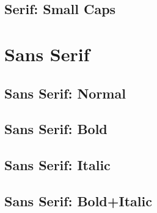 \subsection{Serif: Small Caps}
\begin{rmfamily}
    \begin{scshape}
        \blindtext
    \end{scshape}
\end{rmfamily}



\section{Sans Serif}
\subsection{Sans Serif: Normal}
\begin{sffamily}
    \blindtext
\end{sffamily}

\subsection{Sans Serif: Bold}
\begin{sffamily}
    \begin{bfseries}
        \blindtext
    \end{bfseries}
\end{sffamily}

\subsection{Sans Serif: Italic}
\begin{sffamily}
    \begin{itshape}
        \blindtext
    \end{itshape}
\end{sffamily}

\subsection{Sans Serif: Bold+Italic}
\begin{sffamily}
    \begin{bfseries}
        \begin{itshape}
            \blindtext
        \end{itshape}
    \end{bfseries}
\end{sffamily}

